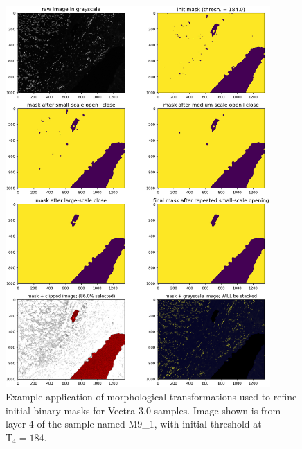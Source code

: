 \documentclass[letterpaper,11pt]{article}
\newcommand{\Tau}{\mathrm{T}}
\begin{document}
\begin{figure}[!ht]
\centering
\includegraphics[width=0.9\textwidth]{images/masking/image_17602_layer_4_masks}
\caption{\footnotesize Example application of morphological transformations used to refine initial binary masks for Vectra 3.0 samples. Image shown is from layer 4 of the sample named M9\_1, with initial threshold at $\Tau_{4}=184$.}
\label{fig:mask_example_vectra_max}
\end{figure}
\end{document}
